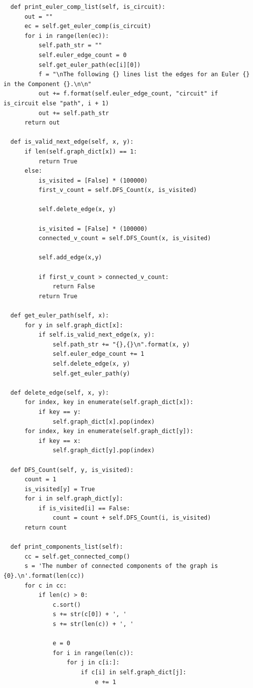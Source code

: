 \documentclass{article}
\begin{document}
\begin{enumerate}
\begin{enumerate}
\begin{lstlisting}
  def print_euler_comp_list(self, is_circuit):
      out = ""
      ec = self.get_euler_comp(is_circuit)  
      for i in range(len(ec)):
          self.path_str = ""
          self.euler_edge_count = 0
          self.get_euler_path(ec[i][0])
          f = "\nThe following {} lines list the edges for an Euler {} in the Component {}.\n\n"            
          out += f.format(self.euler_edge_count, "circuit" if is_circuit else "path", i + 1)
          out += self.path_str
      return out
              
  def is_valid_next_edge(self, x, y): 
      if len(self.graph_dict[x]) == 1: 
          return True
      else:   
          is_visited = [False] * (100000) 
          first_v_count = self.DFS_Count(x, is_visited) 
          
          self.delete_edge(x, y)

          is_visited = [False] * (100000) 
          connected_v_count = self.DFS_Count(x, is_visited) 

          self.add_edge(x,y) 

          if first_v_count > connected_v_count:
              return False
          return True

  def get_euler_path(self, x):
      for y in self.graph_dict[x]: 
          if self.is_valid_next_edge(x, y): 
              self.path_str += "{},{}\n".format(x, y)
              self.euler_edge_count += 1
              self.delete_edge(x, y) 
              self.get_euler_path(y)
              
  def delete_edge(self, x, y): 
      for index, key in enumerate(self.graph_dict[x]): 
          if key == y: 
              self.graph_dict[x].pop(index) 
      for index, key in enumerate(self.graph_dict[y]): 
          if key == x: 
              self.graph_dict[y].pop(index) 
              
  def DFS_Count(self, y, is_visited): 
      count = 1
      is_visited[y] = True
      for i in self.graph_dict[y]:
          if is_visited[i] == False: 
              count = count + self.DFS_Count(i, is_visited)          
      return count              
  
  def print_components_list(self):
      cc = self.get_connected_comp()        
      s = 'The number of connected components of the graph is {0}.\n'.format(len(cc))
      for c in cc:
          if len(c) > 0:
              c.sort()
              s += str(c[0]) + ', '
              s += str(len(c)) + ', '
              
              e = 0
              for i in range(len(c)):
                  for j in c[i:]:
                      if c[i] in self.graph_dict[j]:
                          e += 1
                          

\end{lstlisting}
\end{enumerate}
\end{enumerate}
\end{document}
